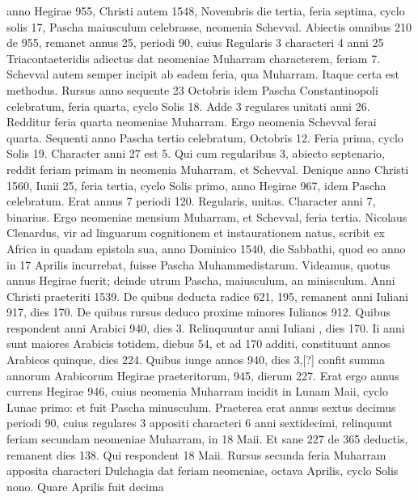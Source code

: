  anno Hegirae
955, Christi autem 1548, Novembris die tertia, feria septima,
cyclo solis 17, Pascha maiusculum celebrasse, neomenia
Schevval.
Abiectis omnibus 210 de 955, remanet annus 25, periodi
90, cuius Regularis 3 characteri 4 anni 25 Triacontaeteridis
adiectus dat neomeniae Muharram characterem, feriam 7.
Schevval
autem semper incipit ab eadem feria, qua Muharram.
Itaque certa est
methodus.
Rursus anno sequente 23 Octobris idem Pascha Constantinopoli
celebratum, feria quarta, cyclo Solis 18.
Adde 3 regulares
unitati anni 26.
Redditur feria quarta neomeniae Muharram.
Ergo
neomenia Schevval ferai quarta.
Sequenti anno Pascha tertio celebratum,
Octobris 12.
Feria prima, cyclo Solis 19.
Character anni 27 est 5.
Qui cum regularibus 3, abiecto septenario, reddit feriam primam in
neomenia Muharram, et Schevval.
Denique anno Christi 1560, Iunii
25, feria tertia, cyclo Solis primo, anno Hegirae 967, idem
Pascha celebratum.
Erat annus 7 periodi 120.
Regularis, unitas.
Character
anni 7, binarius.
Ergo neomeniae mensium Muharram, et Schevval,
feria tertia.
Nicolaus Clenardus, vir ad linguarum cognitionem
et instaurationem natus, scribit ex Africa in quadam epistola
sua, anno Dominico 1540, die Sabbathi, quod eo anno in 17 Aprilis
incurrebat, fuisse Pascha Muhammedistarum.
Videamus, quotus annus
Hegirae fuerit; deinde utrum Pascha, maiusculum, an minisculum.
Anni Christi praeteriti 1539.
De quibus deducta radice 621, 195,
remanent anni Iuliani 917, dies 170.
De quibus rursus deduco proxime
minores Iulianos 912.
Quibus respondent anni Arabici 940,
dies 3.
Relinquuntur anni Iuliani , dies 170.
Ii anni sunt maiores
Arabicis totidem, diebus 54, et ad 170 additi, constituunt annos Arabicos
quinque, dies 224.
Quibus iunge annos 940, dies 3,[?] confit %
summa annorum Arabicorum Hegirae praeteritorum, 945, dierum
227.
Erat ergo annus currens Hegirae 946, cuius neomenia Muharram
incidit in Lunam Maii, cyclo Lunae primo: et fuit Pascha minusculum.
Praeterea erat annus sextus decimus periodi 90, cuius regulares
3 appositi characteri 6 anni sextidecimi, relinquunt feriam secundam
neomeniae Muharram, in 18 Maii.
Et sane 227 de 365 deductis,
remanent dies 138.
Qui respondent 18 Maii.
Rursus secunda
feria Muharram apposita characteri Dulchagia dat feriam  neomeniae,
octava Aprilis, cyclo Solis nono.
Quare  Aprilis fuit decima
